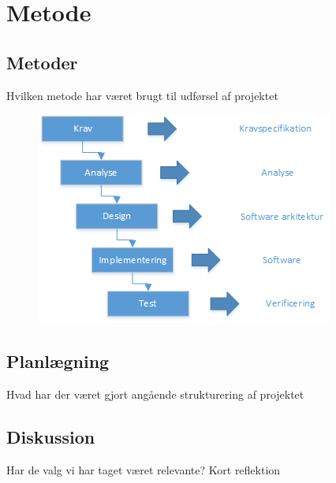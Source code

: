 \documentclass[rapport.tex]{subfiles}
\begin{document}
\section{Metode}
	\subsection{Metoder}
	Hvilken metode har været brugt til udførsel af projektet
\begin{figure}
\centering
\includegraphics[width=0.7\linewidth]{Metodetilgangsdiagram}
\caption{}
\label{fig:Metodetilgangsdiagram}
\end{figure}
	\subsection{Planlægning}
	Hvad har der været gjort angående strukturering af projektet
	\subsection{Diskussion}
	Har de valg vi har taget været relevante? Kort reflektion
		
\end{document}
